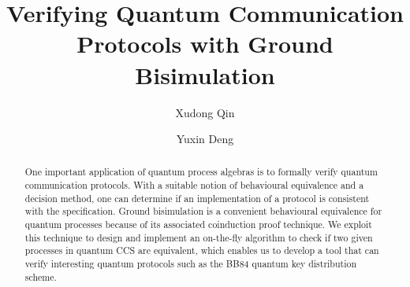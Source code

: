 \documentclass[a4paper,runningheads]{llncs}
\begin{document}
%
\title{Verifying Quantum Communication Protocols with Ground Bisimulation}
%
%
\author{Xudong Qin \and
Yuxin Deng}
%
%
%
\maketitle              %
%
\begin{abstract}
	
One important application of quantum process algebras is to formally verify quantum communication protocols. With a suitable notion of behavioural equivalence and a decision method, one can determine if an implementation of a protocol is consistent with the specification. Ground bisimulation is a convenient behavioural equivalence for quantum processes because of its associated coinduction proof technique. We exploit this technique to design and implement an on-the-fly algorithm to check if two given processes in quantum CCS are equivalent, which enables us to develop a tool that can verify interesting quantum protocols such as the BB84 quantum key distribution scheme.

\end{abstract}
%
%
%
\end{document}
